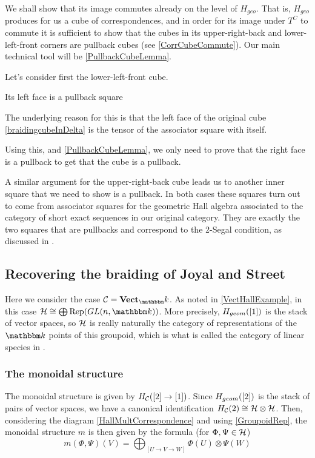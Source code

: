 We shall show that its image commutes already on the level of $H_{geo}$. That is, $H_{geo}$ produces for us a cube of correspondences, and in order for its image under $T^C$ to commute it is sufficient to show that the cubes in its upper-right-back and lower-left-front corners are pullback cubes (see \autoref{CorrCubeCommute}). Our main technical tool will be \autoref{PullbackCubeLemma}.

Let's consider first the lower-left-front cube. 

\begin{Claim}
\label{Lem:LeftFace}
Its left face is a pullback square
\end{Claim}

The underlying reason for this is that the left face of the original cube \autoref{braidingcubeInDelta} is the tensor of the associator square with itself.

Using this, and \autoref{PullbackCubeLemma}, we only need to prove that the right face is a pullback to get that the cube is a pullback.

A similar argument for the upper-right-back cube leads us to another inner square that we need to show is a pullback. In both cases these squares turn out to come from associator squares for the geometric Hall algebra associated to the category of short exact sequences in our original category. They are exactly the two squares that are pullbacks and correspond to the 2-Segal condition, as discussed in \cite[\S 4.5]{GeometricHallAlgebra1}.

\subsection{Recovering the braiding of Joyal and Street}

Here we consider the case $\CCC=\Vect_\field$. As noted in \autoref{VectHallExample}, in this case $\HH\cong\bigoplus \Rep(\GL(n,\field))$. More precisely, $H_{geom}(\left[ 1 \right])$ is the stack of vector spaces, so $\mathcal{H}$ is really naturally the category of representations of the $\field$ points of this groupoid, which is what is called the category of linear species in \cite{Joyal-StreetGLn}.

\subsubsection{The monoidal structure}

The monoidal structure is given by $H_{\mathcal{C}}(\left[ 2 \right]\to\left[ 1 \right])$. Since $H_{geom}(\left[ 2 \right])$ is the stack of pairs of vector spaces, we have a canonical identification $H_{\mathcal{C}}(2)\cong\mathcal{H}\otimes\mathcal{H}$. Then, considering the diagram \autoref{HallMultCorrespondence} and using \autoref{GroupoidRep}, the monoidal structure $m$ is then given by the formula (for $\Phi,\Psi\in\mathcal{H}$)
\[
m(\Phi,\Psi)(V)=\bigoplus_{[U\to V\to W]}\Phi(U)\otimes\Psi(W)
\]

